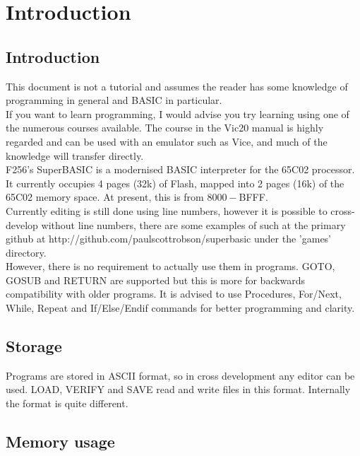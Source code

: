 \chapter{Introduction}

\section{Introduction}

This document is not a tutorial and assumes the reader has some knowledge of programming in general and BASIC in particular. \\

If you want to learn programming, I would advise you try learning using one of the numerous courses available. The course in the Vic20 manual is highly regarded and can be used with an emulator such as Vice, and much of the knowledge will transfer directly.\\

F256's SuperBASIC is a modernised BASIC interpreter for the 65C02 processor. It currently occupies 4 pages (32k) of Flash, mapped into 2 pages (16k) of the 65C02 memory space. At present, this is from $8000-$BFFF.\\

Currently editing is still done using line numbers, however it is possible to cross-develop without line numbers, there are some examples of such at the primary github at http://github.com/paulscottrobson/superbasic under the 'games' directory.\\

However, there is no requirement to actually use them in programs. GOTO, GOSUB and RETURN are supported but this is more for backwards compatibility with older programs. It is advised to use Procedures, For/Next, While, Repeat and If/Else/Endif commands for better programming and clarity.\\

\section{Storage}

Programs are stored in ASCII format, so in cross development any editor can be used. LOAD, VERIFY and SAVE read and write files in this format. Internally the format is quite different.

\section{Memory usage}

